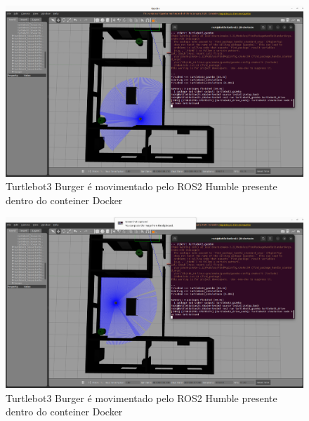 \begin{figure}[htb]
    \centering
    \includegraphics[width=1\linewidth]{Figures/DockerMovimentaRobo1.png}
    \caption{Turtlebot3 Burger é movimentado pelo ROS2 Humble presente dentro do conteiner Docker}
    \label{fig:enter-label}
\end{figure}
\begin{figure}[htb]
    \centering
    \includegraphics[width=1\linewidth]{Figures/DockerMovimentaRobo2.png}
    \caption{Turtlebot3 Burger é movimentado pelo ROS2 Humble presente dentro do conteiner Docker}
    \label{fig:enter-label}
\end{figure}

